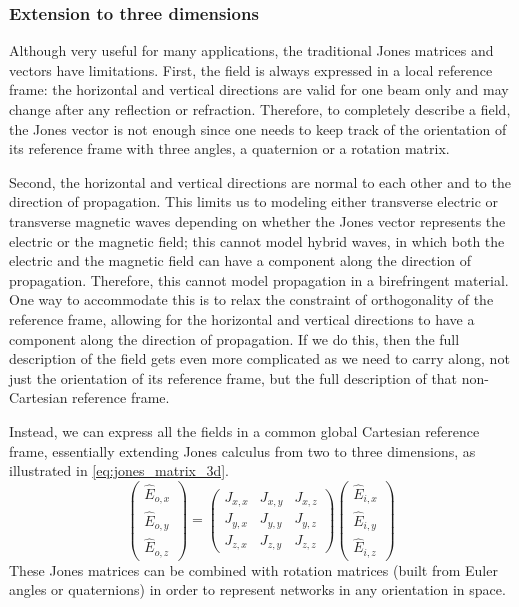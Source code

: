 \subsubsection{Extension to three dimensions}
Although very useful for many applications, the traditional Jones matrices and vectors have limitations.
First, the field is always expressed in a local reference frame: the horizontal and vertical directions are valid for one beam only and may change after any reflection or refraction.
Therefore, to completely describe a field, the Jones vector is not enough since one needs to keep track of the orientation of its reference frame with three angles, a quaternion or a rotation matrix.

Second, the horizontal and vertical directions are normal to each other and to the direction of propagation.
This limits us to modeling either transverse electric or transverse magnetic waves depending on whether the Jones vector represents the electric or the magnetic field;
this cannot model hybrid waves, in which both the electric and the magnetic field can have a component along the direction of propagation.
Therefore, this cannot model propagation in a birefringent material.
One way to accommodate this is to relax the constraint of orthogonality of the reference frame, allowing for the horizontal and vertical directions to have a component along the direction of propagation.
If we do this, then the full description of the field gets even more complicated as we need to carry along, not just the orientation of its reference frame, but the full description of that non-Cartesian reference frame.

Instead, we can express all the fields in a common global Cartesian reference frame, essentially extending Jones calculus from two to three dimensions, as illustrated in \cref{eq:jones_matrix_3d}.
\begin{equation}
    \begin{pmatrix}
        \hat{E}_{o, x}\\
        \hat{E}_{o, y}\\
        \hat{E}_{o, z}
    \end{pmatrix}
    =
    \begin{pmatrix}
        J_{x, x}   &   J_{x, y}   &   J_{x, z} \\
        J_{y, x}   &   J_{y, y}   &   J_{y, z} \\
        J_{z, x}   &   J_{z, y}   &   J_{z, z}
    \end{pmatrix}
    \begin{pmatrix}
        \hat{E}_{i, x}\\
        \hat{E}_{i, y}\\
        \hat{E}_{i, z}
    \end{pmatrix}
    \label{eq:jones_matrix_3d}
\end{equation}
These Jones matrices can be combined with rotation matrices (built from Euler angles or quaternions) in order to represent networks in any orientation in space.


